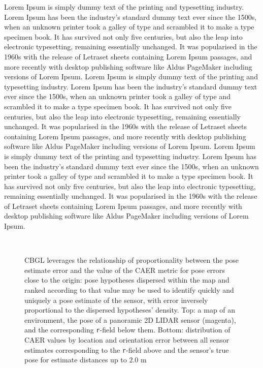 Lorem Ipsum is simply dummy text of the printing and typesetting industry.
Lorem Ipsum has been the industry's standard dummy text ever since the 1500s,
when an unknown printer took a galley of type and scrambled it to make a type
specimen book. It has survived not only five centuries, but also the leap into
electronic typesetting, remaining essentially unchanged. It was popularised in
the 1960s with the release of Letraset sheets containing Lorem Ipsum passages,
and more recently with desktop publishing software like Aldus PageMaker
including versions of Lorem Ipsum. Lorem Ipsum is simply dummy text of the
printing and typesetting industry.  Lorem Ipsum has been the industry's
standard dummy text ever since the 1500s, when an unknown printer took a galley
of type and scrambled it to make a type specimen book. It has survived not only
five centuries, but also the leap into electronic typesetting, remaining
essentially unchanged. It was popularised in the 1960s with the release of
Letraset sheets containing Lorem Ipsum passages, and more recently with desktop
publishing software like Aldus PageMaker including versions of Lorem Ipsum.
Lorem Ipsum is simply dummy text of the printing and typesetting industry.
Lorem Ipsum has been the industry's standard dummy text ever since the 1500s,
when an unknown printer took a galley of type and scrambled it to make a type
specimen book. It has survived not only five centuries, but also the leap into
electronic typesetting, remaining essentially unchanged. It was popularised in
the 1960s with the release of Letraset sheets containing Lorem Ipsum passages,
and more recently with desktop publishing software like Aldus PageMaker
including versions of Lorem Ipsum.

\begin{figure}
  \subfloat{    \label{fig:a}} \vspace{-1.7cm}\\
  \subfloat{\hspace{-0.3cm} \label{fig:b}}
  \caption{\small
           CBGL leverages the relationship of proportionality between the pose
           estimate error and the value of the CAER metric for pose errors
           close to the origin: pose hypotheses dispersed within the map and
           ranked according to that value may be used to identify quickly and
           uniquely a pose estimate of the sensor, with error inversely
           proportional to the dispersed hypotheses' density.
           Top: a map of an environment, the pose of a panoramic 2D
           LIDAR sensor (magenta), and the corresponding \texttt{r}-field below
           them. Bottom: distribution of CAER values by location and
           orientation error between all sensor estimates corresponding to the
           \texttt{r}-field above and the sensor's true pose for estimate
           distances up to $2.0$ m
           }
  \vspace{-0.75cm}
  \label{fig:AB}
\end{figure}

